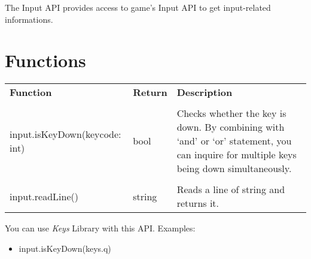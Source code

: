 The Input API provides access to game's Input API to get input-related informations.

\section{Functions}

\begin{tabularx}{\textwidth}{l l X}
	\textbf{\large Function} & \textbf{\large Return} & \textbf{\large Description}
	\\ \\
	\endhead
	input.isKeyDown(keycode: int) & bool & Checks whether the key is down. By combining with `and' or `or' statement, you can inquire for multiple keys being down simultaneously.
	\\ \\
	input.readLine() & string & Reads a line of string and returns it.
\end{tabularx}

You can use \emph{Keys} Library with this API. Examples:

\begin{itemize}
\item input.isKeyDown(keys.q)
\end{itemize}